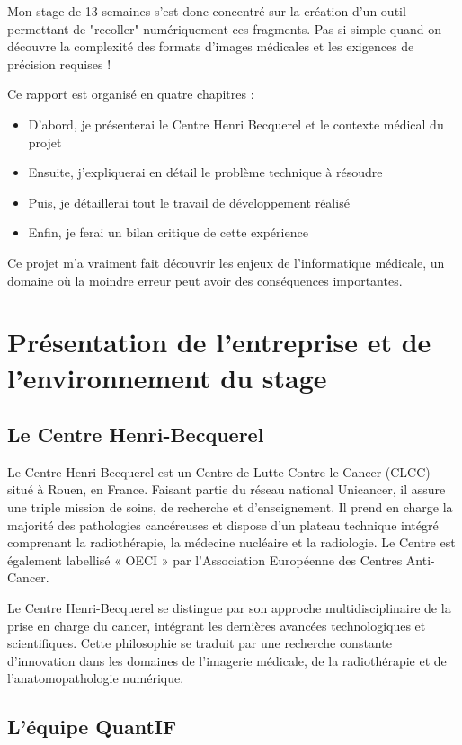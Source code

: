 \documentclass[11pt,a4paper]{report}
\begin{document}
Mon stage de 13 semaines s'est donc concentré sur la création d'un outil permettant de "recoller" numériquement ces fragments. Pas si simple quand on découvre la complexité des formats d'images médicales et les exigences de précision requises !

Ce rapport est organisé en quatre chapitres :
\begin{itemize}
\item D'abord, je présenterai le Centre Henri Becquerel et le contexte médical du projet
\item Ensuite, j'expliquerai en détail le problème technique à résoudre
\item Puis, je détaillerai tout le travail de développement réalisé
\item Enfin, je ferai un bilan critique de cette expérience
\end{itemize}

Ce projet m'a vraiment fait découvrir les enjeux de l'informatique médicale, un domaine où la moindre erreur peut avoir des conséquences importantes.

\chapter{Présentation de l'entreprise et de l'environnement du stage}

\section{Le Centre Henri-Becquerel}

Le Centre Henri-Becquerel est un Centre de Lutte Contre le Cancer (CLCC) situé à Rouen, en France. Faisant partie du réseau national Unicancer, il assure une triple mission de soins, de recherche et d'enseignement. Il prend en charge la majorité des pathologies cancéreuses et dispose d'un plateau technique intégré comprenant la radiothérapie, la médecine nucléaire et la radiologie. Le Centre est également labellisé « OECI » par l'Association Européenne des Centres Anti-Cancer.

Le Centre Henri-Becquerel se distingue par son approche multidisciplinaire de la prise en charge du cancer, intégrant les dernières avancées technologiques et scientifiques. Cette philosophie se traduit par une recherche constante d'innovation dans les domaines de l'imagerie médicale, de la radiothérapie et de l'anatomopathologie numérique.

\section{L'équipe QuantIF}
\end{document}
